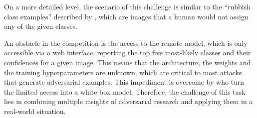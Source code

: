 On a more detailed level, the scenario of this challenge is similar to the \enquote{rubbish class examples} described by \citet{szegedy2015explaining}, which are images that a human would not assign any of the given classes.

An obstacle in the competition is the access to the remote model, which is only accessible via a web interface,
reporting the top five most-likely classes and their confidences for a given image.
This means that the architecture, the weights and the training hyperparameters are unknown, which are critical to most attacks that generate adversarial examples.
This impediment is overcome by \citet{papernot2017practical} who turn the limited access into a white box model.
Therefore, the challenge of this task lies in combining multiple insights of adversarial research and applying them in a real-world situation.

